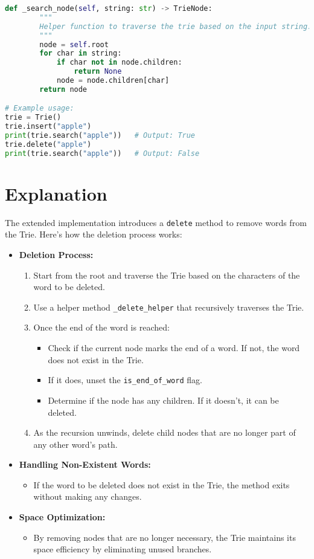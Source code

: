 \begin{fullwidth}
\begin{lstlisting}[language=Python]
    def _search_node(self, string: str) -> TrieNode:
        """
        Helper function to traverse the trie based on the input string.
        """
        node = self.root
        for char in string:
            if char not in node.children:
                return None
            node = node.children[char]
        return node

# Example usage:
trie = Trie()
trie.insert("apple")
print(trie.search("apple"))   # Output: True
trie.delete("apple")
print(trie.search("apple"))   # Output: False
\end{lstlisting}
\end{fullwidth}

\section*{Explanation}

The extended implementation introduces a \texttt{delete} method to remove words from the Trie. Here's how the deletion process works:

\begin{itemize}
    \item \textbf{Deletion Process:}
    \begin{enumerate}
        \item Start from the root and traverse the Trie based on the characters of the word to be deleted.
        \item Use a helper method \texttt{\_delete\_helper} that recursively traverses the Trie.
        \item Once the end of the word is reached:
        \begin{itemize}
            \item Check if the current node marks the end of a word. If not, the word does not exist in the Trie.
            \item If it does, unset the \texttt{is\_end\_of\_word} flag.
            \item Determine if the node has any children. If it doesn't, it can be deleted.
        \end{itemize}
        \item As the recursion unwinds, delete child nodes that are no longer part of any other word's path.
    \end{enumerate}
    
    \item \textbf{Handling Non-Existent Words:}
    \begin{itemize}
        \item If the word to be deleted does not exist in the Trie, the method exits without making any changes.
    \end{itemize}
    
    \item \textbf{Space Optimization:}
    \begin{itemize}
        \item By removing nodes that are no longer necessary, the Trie maintains its space efficiency by eliminating unused branches.
    \end{itemize}
\end{itemize}

